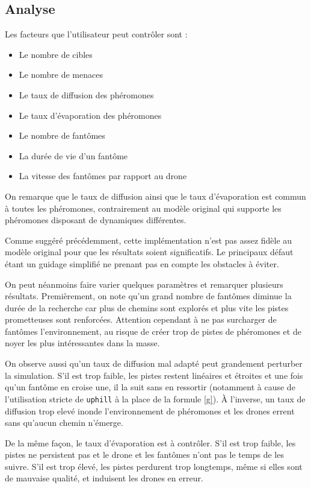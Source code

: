 \documentclass[12pt]{article}
\begin{document}
\subsection{Analyse}

Les facteurs que l'utilisateur peut contrôler sont :

\begin{itemize}
\item{Le nombre de cibles}
\item{Le nombre de menaces}
\item{Le taux de diffusion des phéromones}
\item{Le taux d'évaporation des phéromones}
\item{Le nombre de fantômes}
\item{La durée de vie d'un fantôme}
\item{La vitesse des fantômes par rapport au drone}
\end{itemize}

On remarque que le taux de diffusion ainsi que le taux d'évaporation
est commun à toutes les phéromones, contrairement au modèle original
qui supporte les phéromones disposant de dynamiques différentes.

Comme suggéré précédemment, cette implémentation n'est pas assez
fidèle au modèle original pour que les résultats soient
significatifs. Le principaux défaut étant un guidage simplifié ne
prenant pas en compte les obstacles à éviter.

On peut néanmoins faire varier quelques paramètres et remarquer
plusieurs résultats. Premièrement, on note qu'un grand nombre de
fantômes diminue la durée de la recherche car plus de chemins sont
explorés et plus vite les pistes prometteuses sont renforcées.
Attention cependant à ne pas surcharger de fantômes l'environnement,
au risque de créer trop de pistes de phéromones et de noyer les plus
intéressantes dans la masse.

On observe aussi qu'un taux de diffusion mal adapté peut grandement
perturber la simulation. S'il est trop faible, les pistes restent
linéaires et étroites et une fois qu'un fantôme en croise une, il la
suit sans en ressortir (notamment à cause de l'utilisation stricte de
\texttt{uphill} à la place de la formule \ref{g}). \`A l'inverse, un
taux de diffusion trop elevé inonde l'environnement de phéromones et
les drones errent sans qu'aucun chemin n'émerge.

De la même façon, le taux d'évaporation est à contrôler. S'il est trop
faible, les pistes ne persistent pas et le drone et les fantômes n'ont
pas le temps de les suivre. S'il est trop élevé, les pistes perdurent
trop longtemps, même si elles sont de mauvaise qualité, et induisent
les drones en erreur.
\end{document}
